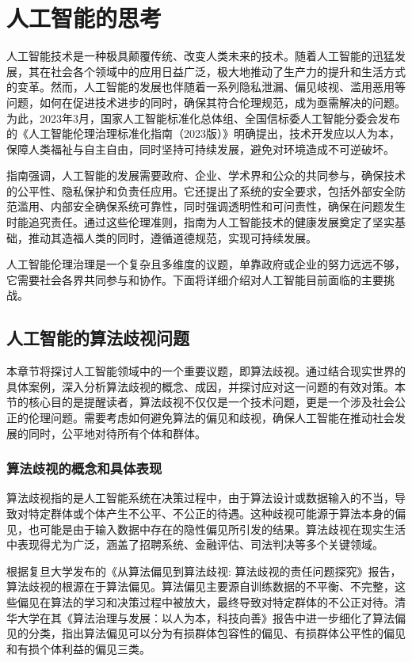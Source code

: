 \chapter{人工智能的思考}
人工智能技术是一种极具颠覆传统、改变人类未来的技术。随着人工智能的迅猛发展，其在社会各个领域中的应用日益广泛，极大地推动了生产力的提升和生活方式的变革。然而，人工智能的发展也伴随着一系列隐私泄漏、偏见岐视、滥用恶用等问题，如何在促进技术进步的同时，确保其符合伦理规范，成为亟需解决的问题。为此，2023年3月，国家人工智能标准化总体组、全国信标委人工智能分委会发布的《人工智能伦理治理标准化指南（2023版）》明确提出，技术开发应以人为本，保障人类福祉与自主自由，同时坚持可持续发展，避免对环境造成不可逆破坏。

指南强调，人工智能的发展需要政府、企业、学术界和公众的共同参与，确保技术的公平性、隐私保护和负责任应用。它还提出了系统的安全要求，包括外部安全防范滥用、内部安全确保系统可靠性，同时强调透明性和可问责性，确保在问题发生时能追究责任。通过这些伦理准则，指南为人工智能技术的健康发展奠定了坚实基础，推动其造福人类的同时，遵循道德规范，实现可持续发展。

人工智能伦理治理是一个复杂且多维度的议题，单靠政府或企业的努力远远不够，它需要社会各界共同参与和协作。下面将详细介绍对人工智能目前面临的主要挑战。

\section{人工智能的算法歧视问题}
本章节将探讨人工智能领域中的一个重要议题，即算法歧视。通过结合现实世界的具体案例，深入分析算法歧视的概念、成因，并探讨应对这一问题的有效对策。本节的核心目的是提醒读者，算法歧视不仅仅是一个技术问题，更是一个涉及社会公正的伦理问题。需要考虑如何避免算法的偏见和歧视，确保人工智能在推动社会发展的同时，公平地对待所有个体和群体。
\subsection{算法歧视的概念和具体表现}
算法歧视指的是人工智能系统在决策过程中，由于算法设计或数据输入的不当，导致对特定群体或个体产生不公平、不公正的待遇。这种歧视可能源于算法本身的偏见，也可能是由于输入数据中存在的隐性偏见所引发的结果。算法歧视在现实生活中表现得尤为广泛，涵盖了招聘系统、金融评估、司法判决等多个关键领域。

根据复旦大学发布的《从算法偏见到算法歧视: 算法歧视的责任问题探究》报告，算法歧视的根源在于算法偏见。算法偏见主要源自训练数据的不平衡、不完整，这些偏见在算法的学习和决策过程中被放大，最终导致对特定群体的不公正对待。清华大学在其《算法治理与发展：以人为本，科技向善》报告中进一步细化了算法偏见的分类，指出算法偏见可以分为有损群体包容性的偏见、有损群体公平性的偏见和有损个体利益的偏见三类。


